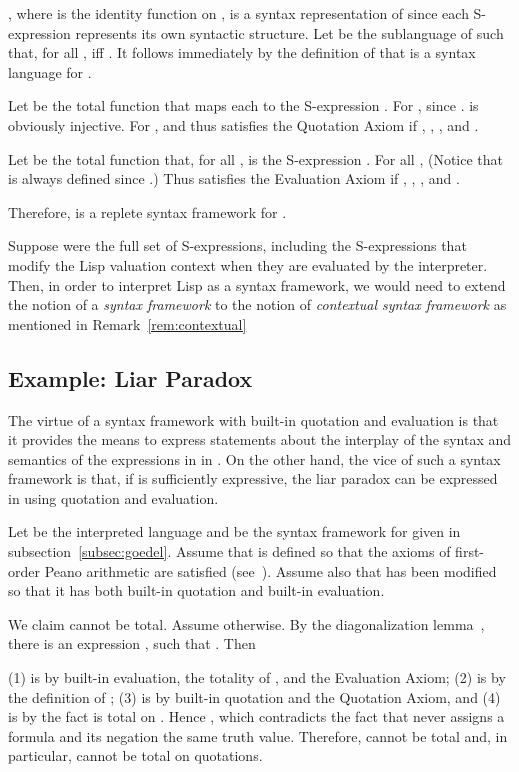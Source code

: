 \documentclass[11pt,fleqn]{article}
\newcommand{\bsp}{\begin{sloppypar}}
\newcommand{\esp}{\end{sloppypar}}
\begin{document}
, where  is the identity function
on , is a syntax representation of  since each S-expression
represents its own syntactic structure.  Let  be the sublanguage
of  such that, for all ,  iff .
It follows immediately by the definition of  that  is a
syntax language for .

Let  be the total function that maps each 
to the S-expression .  For ,  since .   is obviously
injective.  For ,  and thus  satisfies the Quotation Axiom if
, , ,
and .

Let  be the total function that, for all ,
 is the S-expression .  For all ,  (Notice that  is always defined
since .)  Thus  satisfies the Evaluation Axiom if , , , and
.

Therefore,  is a replete syntax
framework for .

Suppose  were the full set of S-expressions, including the
S-expressions that modify the Lisp valuation context when they are
evaluated by the interpreter.  Then, in order to interpret Lisp as a
syntax framework, we would need to extend the notion of a \emph{syntax
  framework} to the notion of \emph{contextual syntax framework} as
mentioned in Remark~\ref{rem:contextual}

\subsection{Example: Liar Paradox} \label{subsec:liar}

The virtue of a syntax framework with built-in quotation and
evaluation is that it provides the means to express statements about
the interplay of the syntax and semantics of the expressions in
 in .  On the other hand, the vice of such a syntax
framework is that, if  is sufficiently expressive, the liar paradox
can be expressed in  using quotation and evaluation.

\bsp Let  be the
interpreted language and  be the
syntax framework for  given in subsection~\ref{subsec:goedel}.  Assume
that  is defined so that the axioms of first-order Peano arithmetic
are satisfied (see~\cite{Mendelson09}).  Assume also that  has
been modified so that it has both built-in quotation and built-in
evaluation. \esp

\bsp We claim  cannot be total.  Assume otherwise.  By the
diagonalization lemma~\cite{Carnap34}, there is an expression , such that .  Then
\esp \setcounter{equation}{0}

(1) is by built-in evaluation, the totality of , and the
Evaluation Axiom; (2) is by the definition of ; (3) is by built-in
quotation and the Quotation Axiom, and (4) is by the fact  is total
on .  Hence , which
contradicts the fact that  never assigns a formula and its negation
the same truth value.  Therefore,  cannot be total and, in
particular, cannot be total on quotations.
\end{document}
